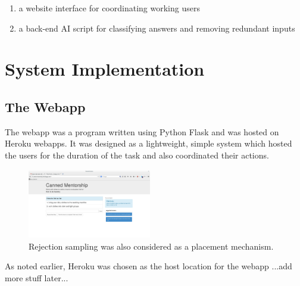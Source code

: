 \begin{enumerate}
	\item a website interface for coordinating working users
	\item a back-end AI script for classifying answers and removing redundant inputs
\end{enumerate}

\section{System Implementation}

\subsection{The Webapp}
The webapp was a program written using Python Flask and was hosted on Heroku webapps. 
It was designed as a lightweight, simple system which hosted the users for the duration of the task and also coordinated their actions.

\begin{figure}[h]
	\begin{center}
		\includegraphics[width=0.48\textwidth]{figures/cmInterface.png}
		\caption{Rejection sampling was also considered as a placement mechanism.}
		\label{fig:rejection_sampling_placement}
	\end{center}
\end{figure}

As noted earlier, Heroku was chosen as the host location for the webapp ...add more stuff later...




%

